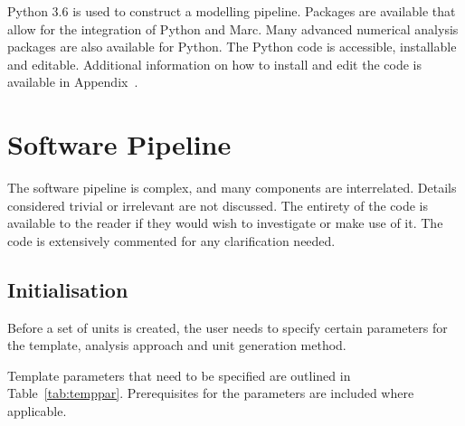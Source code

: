 Python 3.6 is used to construct a modelling pipeline. Packages are available that allow for the integration of Python and Marc. Many advanced numerical analysis packages are also available for Python. The Python code is accessible, installable and editable. Additional information on how to install and edit the code is available in Appendix~.

\section{Software Pipeline}
\label{sec:SW}

The software pipeline is complex, and many components are interrelated. Details considered trivial or irrelevant are not discussed. The entirety of the code is available to the reader if they would wish to investigate or make use of it. The code is extensively commented for any clarification needed.

\subsection{Initialisation}
\label{ssec:init}

Before a set of units is created, the user needs to specify certain parameters for the template, analysis approach and unit generation method.

Template parameters that need to be specified are outlined in Table~\ref{tab:temppar}. Prerequisites for the parameters are included where applicable.

